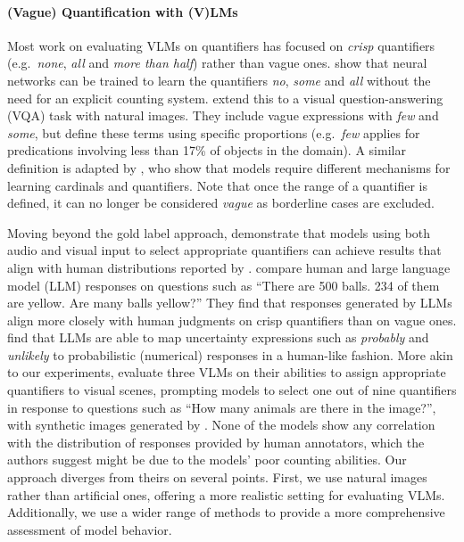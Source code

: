 \paragraph{(Vague) Quantification with (V)LMs}
Most work on evaluating VLMs on quantifiers has focused on \emph{crisp} quantifiers (e.g.\ \textit{none}, \textit{all} and \textit{more than half}) rather than vague ones. \citet{sorodoc2016-quantify} show that neural networks can be trained to learn the quantifiers \textit{no}, \textit{some} and \textit{all} without the need for an explicit counting system. \citet{sorodoc2018-neural} extend this to a visual question-answering (VQA) task with natural images. They include vague expressions with \textit{few} and \textit{some}, but define these terms using specific proportions (e.g.\ {\em few} applies for predications involving less than 17\% of objects in the domain).
A similar definition is adapted by \citet{pezzelle2017-fuzzy}, who show that models require different mechanisms for learning cardinals and quantifiers.
Note that once the range of a quantifier is defined, it can no longer be considered \emph{vague} as borderline cases are excluded.

Moving beyond the gold label approach, \citet{testoni2019-sound} demonstrate that models using both audio and visual input to select appropriate quantifiers can achieve results that align with human distributions reported by \citet{pezzelle2018-mental}. 
\citet{enyan2024-quantifiers} compare human and large language model (LLM) responses on questions such as ``There are 500 balls. 234 of them are yellow. Are many balls yellow?''
They find that responses generated by LLMs align more closely with human judgments on crisp quantifiers than on vague ones. 
\citet{belem2024-uncertainty} find that LLMs are able to map uncertainty expressions such as \textit{probably} and \textit{unlikely} to probabilistic (numerical) responses in a human-like fashion.
More akin to our experiments, \citet{testoni2024-quantifying} evaluate three VLMs on their abilities to assign appropriate quantifiers to visual scenes, prompting models to select one out of nine quantifiers in response to questions such as ``How many animals are there in the image?'', with 
synthetic images generated by \citet{pezzelle2018-mental}. 
None of the models show any correlation with the distribution of responses provided by human annotators, which the authors suggest might be due to the models' poor counting abilities. 
Our approach diverges from theirs on several points. 
First, we use natural images rather than artificial ones, offering a more realistic setting for evaluating VLMs.
Additionally, we use a wider range of methods to provide a more comprehensive assessment of model behavior.